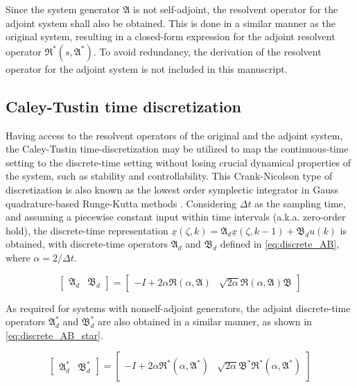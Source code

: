 Since the system generator $\mathfrak{A}$ is not self-adjoint, the resolvent operator for the adjoint system shall also be obtained. This is done in a similar manner as the original system, resulting in a closed-form expression for the adjoint resolvent operator $\mathfrak{R}^*(s, \mathfrak{A}^*)$. To avoid redundancy, the derivation of the resolvent operator for the adjoint system is not included in this manuscript.

\subsection{Caley-Tustin time discretization}

Having access to the resolvent operators of the original and the adjoint system, the Caley-Tustin time-discretization may be utilized to map the continuous-time setting to the discrete-time setting without losing crucial dynamical properties of the system, such as stability and controllability. This Crank-Nicolson type of discretization is also known as the lowest order symplectic integrator in Gauss quadrature-based Runge-Kutta methods \cite{hairer2006geometric}. Considering $\Delta t$ as the sampling time, and assuming a piecewise constant input within time intervals (a.k.a. zero-order hold), the discrete-time representation $\underline{x}(\zeta, k) = \mathfrak{A}_d \underline{x}(\zeta, k-1) + \mathfrak{B}_d u(k)$ is obtained, with discrete-time operators $\mathfrak{A}_d$ and $\mathfrak{B}_d$ defined in \eqref{eq:discrete_AB}, where $\alpha = 2/{\Delta t}$.

\begin{equation} \label{eq:discrete_AB}
    \begin{bmatrix}
        \mathfrak{A}_d & \mathfrak{B}_d
    \end{bmatrix} = 
    \begin{bmatrix}
        -I + 2\alpha \mathfrak{R}(\alpha, \mathfrak{A}) & \sqrt{2\alpha} \mathfrak{R}(\alpha, \mathfrak{A}) \mathfrak{B}
    \end{bmatrix}
\end{equation}

As required for systems with nonself-adjoint generators, the adjoint discrete-time operators $\mathfrak{A}_d^*$ and $\mathfrak{B}_d^*$ are also obtained in a similar manner, as shown in \eqref{eq:discrete_AB_star}.

\begin{equation} \label{eq:discrete_AB_star}
    \begin{bmatrix}
        \mathfrak{A}_d^* & \mathfrak{B}_d^*
    \end{bmatrix} = 
    \begin{bmatrix}
        -I + 2\alpha \mathfrak{R}^*(\alpha, \mathfrak{A}^*) & \sqrt{2\alpha} \mathfrak{B}^* \mathfrak{R}^*(\alpha, \mathfrak{A}^*)
    \end{bmatrix}
\end{equation}

